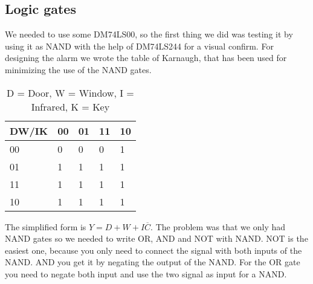 \subsection{Logic gates}
We needed to use some DM74LS00, so the first thing we did was testing it by using it as NAND with the help of DM74LS244 for a visual confirm.
For designing the alarm we wrote the table of Karnaugh, that has been used for minimizing the use of the NAND gates.

\begin{table}[]
\centering
\caption{D = Door, W = Window, I = Infrared, K = Key}
\label{my-label}
\begin{tabular}{lllll}
\hline
 DW/IK & 00 & 01 & 11 & 10 \\ \hline
 00    & 0  & 0  & 0  & 1 \\
 01    & 1  & 1  & 1  & 1 \\
 11    & 1  & 1  & 1  & 1 \\ 
 10    & 1  & 1  & 1  & 1 \\ \hline
\end{tabular}
\end{table}

The simplified form is $Y = D + W + I\overline{C}$. The problem was that we only had NAND gates so we needed to write OR, AND and NOT with NAND. NOT is the easiest one, because you only need to connect the signal with both inputs of the NAND. AND you get it by negating the output of the NAND. For the OR gate you need to negate both input and use the two signal as input  for a NAND.

